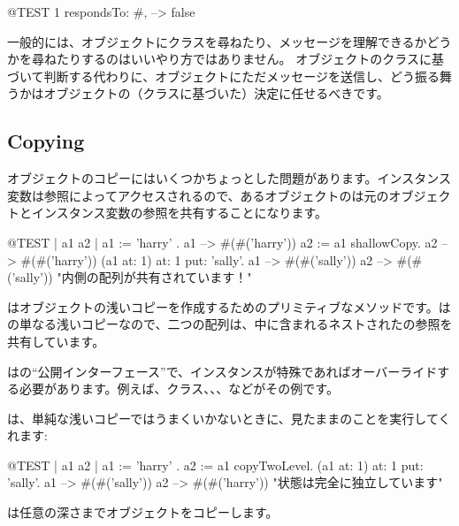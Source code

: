 \documentclass[a4paper,10pt,twoside]{book}
\begin{document}
\begin{code}{@TEST}
1 respondsTo: #, --> false
\end{code}

一般的には、オブジェクトにクラスを尋ねたり、メッセージを理解できるかどうかを尋ねたりするのはいいやり方ではありません。
オブジェクトのクラスに基づいて判断する代わりに、オブジェクトにただメッセージを送信し、どう振る舞うかはオブジェクトの（クラスに基づいた）決定に任せるべきです。

\subsection{Copying}

オブジェクトのコピーにはいくつかちょっとした問題があります。インスタンス変数は参照によってアクセスされるので、あるオブジェクトのは元のオブジェクトとインスタンス変数の参照を共有することになります。

\begin{code}{@TEST | a1 a2 |}
a1 := { { 'harry' } }.
a1 --> #(#('harry'))
a2 := a1 shallowCopy.
a2 --> #(#('harry'))
(a1 at: 1) at: 1 put: 'sally'.
a1 --> #(#('sally'))
a2 --> #(#('sally'))    "内側の配列が共有されています！"
\end{code}

はオブジェクトの浅いコピーを作成するためのプリミティブなメソッドです。はの単なる浅いコピーなので、二つの配列は、中に含まれるネストされたの参照を共有しています。

はの``公開インターフェース''で、インスタンスが特殊であればオーバーライドする必要があります。例えば、クラス、、、などがその例です。

は、単純な浅いコピーではうまくいかないときに、見たままのことを実行してくれます:

\begin{code}{@TEST | a1 a2 |}
a1 := { { 'harry' } } .
a2 := a1 copyTwoLevel.
(a1 at: 1) at: 1 put: 'sally'.
a1 --> #(#('sally'))
a2 --> #(#('harry'))    "状態は完全に独立しています"
\end{code}

は任意の深さまでオブジェクトをコピーします。
\end{document}
